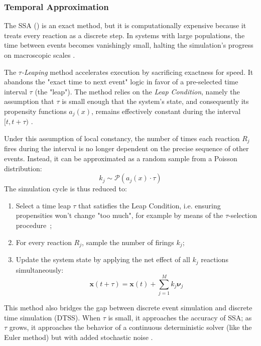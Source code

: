 \subsubsection{Temporal Approximation}

The \ac{SSA} () is an exact method, but it is computationally
expensive because it treats every reaction as a discrete step. In systems with
large populations, the time between events becomes vanishingly small, halting
the simulation's progress on macroscopic scales \cite{Gillespie2001ACSSCRS}.

The $\tau$\emph{-Leaping} method accelerates execution by sacrificing exactness for
speed. It abandons the "exact time to next event" logic in favor of a
pre-selected time interval $\tau$ (the "leap"). The method relies on the
\emph{Leap Condition}, namely the assumption that $\tau$ is small enough that the
system's state, and consequently its propensity functions $a_j(x)$, remains
effectively constant during the interval $[t, t+\tau)$
\cite{Gillespie2001ACSSCRS}.

Under this assumption of local constancy, the number of times each reaction
$R_j$ fires during the interval is no longer dependent on the precise sequence
of other events. Instead, it can be approximated as a random sample from a
Poisson distribution:
%
\begin{equation}
	k_j \sim \mathcal{P}(a_j(x) \cdot \tau)
\end{equation}
%
The simulation cycle is thus reduced to:
\begin{enumerate}
	\item Select a time leap $\tau$ that satisfies the Leap Condition, i.e.
		ensuring propensities won't change "too much", for example by means of
		the $\tau$-selection procedure~\cite{yao2006ESSTLSM};
	\item For every reaction $R_j$, sample the number of firings $k_j$;
	\item Update the system state by applying the net effect of all $k_j$
		reactions simultaneously:
	      \begin{equation}
		      \mathbf{x}(t + \tau) = \mathbf{x}(t) + \sum_{j=1}^{M} k_j \boldsymbol{\nu}_j
	      \end{equation}
\end{enumerate}

This method also bridges the gap between discrete event simulation and
discrete time simulation (DTSS). When $\tau$ is small, it approaches the
accuracy of SSA; as $\tau$ grows, it approaches the behavior of a continuous
deterministic solver (like the Euler method) but with added stochastic noise
\cite{Gillespie2001ACSSCRS}.

